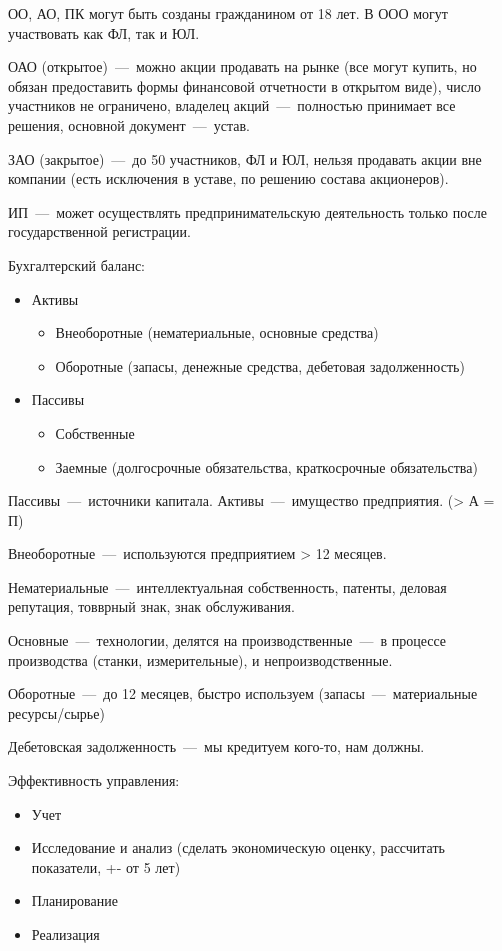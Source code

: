\documentclass[14pt]{extarticle}
\begin{document}
ОО, АО, ПК могут быть созданы гражданином от 18 лет. В ООО могут участвовать как ФЛ, так и ЮЛ.

ОАО (открытое)~---~можно акции продавать на рынке (все могут купить, но обязан предоставить формы финансовой отчетности в открытом виде), число участников не ограничено, владелец акций~---~полностью принимает все решения, основной документ~---~устав.

ЗАО (закрытое)~---~до 50 участников, ФЛ и ЮЛ, нельзя продавать акции вне компании (есть исключения в уставе, по решению состава акционеров).

ИП~---~может осуществлять предпринимательскую деятельность только после государственной регистрации.

Бухгалтерский баланс:

\begin{itemize}
	\item Активы
	\begin{itemize}
		\item Внеоборотные (нематериальные, основные средства)
		\item Оборотные (запасы, денежные средства, дебетовая задолженность)
	\end{itemize}
	\item Пассивы
	\begin{itemize}
		\item Собственные
		\item Заемные (долгосрочные обязательства, краткосрочные обязательства)
	\end{itemize}
\end{itemize}

Пассивы~---~источники капитала. Активы~---~имущество предприятия. (> А = П)

Внеоборотные~---~используются предприятием > 12 месяцев.

Нематериальные~---~интеллектуальная собственность, патенты, деловая репутация, товврный знак, знак обслуживания.

Основные~---~технологии, делятся на производственные~---~в процессе производства (станки, измерительные), и непроизводственные.

Оборотные~---~до 12 месяцев, быстро используем (запасы~---~материальные ресурсы/сырье)

Дебетовская задолженность~---~мы кредитуем кого-то, нам должны.

Эффективность управления:

\begin{itemize}
	\item Учет
	\item Исследование и анализ (сделать экономическую оценку, рассчитать показатели, +- от 5 лет)
	\item Планирование
	\item Реализация
\end{itemize}
\end{document}
